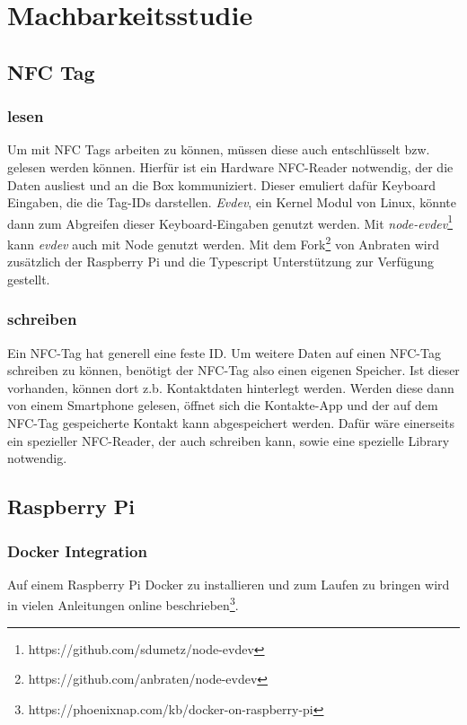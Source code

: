 \documentclass[10pt, a4paper]{article}
\begin{document}
\section{Machbarkeitsstudie}
\label{machbarkeitsstudie}

\subsection{NFC Tag}
\subsubsection*{lesen}
Um mit NFC Tags arbeiten zu können, müssen diese auch entschlüsselt bzw. gelesen werden können.
Hierfür ist ein Hardware NFC-Reader notwendig, der die Daten ausliest und an die Box kommuniziert.
Dieser emuliert dafür Keyboard Eingaben, die die Tag-IDs darstellen.
\textit{Evdev}, ein Kernel Modul von Linux, könnte dann zum Abgreifen dieser Keyboard-Eingaben genutzt werden. Mit \textit{node-evdev}\footnote{https://github.com/sdumetz/node-evdev} kann \textit{evdev} auch mit Node genutzt werden. Mit dem Fork\footnote{https://github.com/anbraten/node-evdev} von Anbraten wird zusätzlich der Raspberry Pi und die Typescript Unterstützung zur Verfügung gestellt.

\subsubsection*{schreiben}
Ein NFC-Tag hat generell eine feste ID.
Um weitere Daten auf einen NFC-Tag schreiben zu können, benötigt der NFC-Tag also einen eigenen Speicher.
Ist dieser vorhanden, können dort z.b. Kontaktdaten hinterlegt werden. Werden diese dann von einem Smartphone gelesen, öffnet sich die Kontakte-App und der auf dem NFC-Tag gespeicherte Kontakt kann abgespeichert werden.
Dafür wäre einerseits ein spezieller NFC-Reader, der auch schreiben kann, sowie eine spezielle Library notwendig.

\subsection{Raspberry Pi}
\subsubsection{Docker Integration}
Auf einem Raspberry Pi Docker zu installieren und zum Laufen zu bringen wird in vielen Anleitungen online beschrieben\footnote{https://phoenixnap.com/kb/docker-on-raspberry-pi}.
\end{document}
